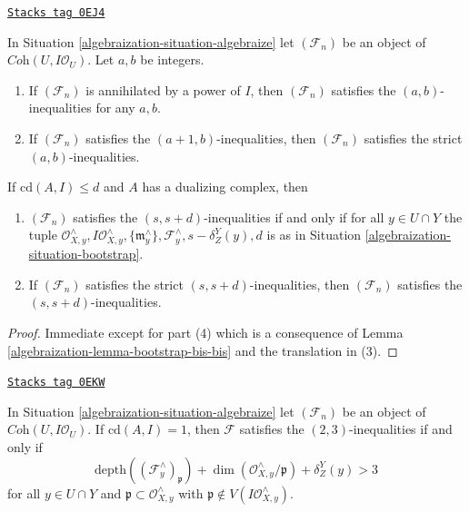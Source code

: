 \begin{lemma}[Elementary]
\label{algebraization-lemma-elementary}
\href{https://stacks.math.columbia.edu/tag/0EJ4}{\texttt{Stacks tag 0EJ4}}

In Situation \ref{algebraization-situation-algebraize} let $(\mathcal{F}_n)$ be an object
of $\textit{Coh}(U, I\mathcal{O}_U)$. Let $a, b$ be integers.
\begin{enumerate}
\item If $(\mathcal{F}_n)$ is annihilated by a power of $I$, then
$(\mathcal{F}_n)$ satisfies the $(a, b)$-inequalities for any $a, b$.
\item If $(\mathcal{F}_n)$ satisfies the $(a + 1, b)$-inequalities, then
$(\mathcal{F}_n)$ satisfies the strict $(a, b)$-inequalities.
\end{enumerate}
If $\text{cd}(A, I) \leq d$ and $A$ has a dualizing complex, then
\begin{enumerate}
\item[(3)] $(\mathcal{F}_n)$ satisfies the $(s, s + d)$-inequalities
if and only if for all $y \in U \cap Y$ the tuple
$\mathcal{O}_{X, y}^\wedge, I\mathcal{O}_{X, y}^\wedge,
\{\mathfrak m_y^\wedge\}, \mathcal{F}_y^\wedge, s - \delta^Y_Z(y), d$
is as in Situation \ref{algebraization-situation-bootstrap}.
\item[(4)]
If $(\mathcal{F}_n)$ satisfies the strict $(s, s + d)$-inequalities, then
$(\mathcal{F}_n)$ satisfies the $(s, s + d)$-inequalities.
\end{enumerate}
\end{lemma}

\begin{proof}

Immediate except for part (4) which is a consequence of
Lemma \ref{algebraization-lemma-bootstrap-bis-bis} and the translation in (3).
\end{proof}

\begin{lemma}[Explain 2 3 cd 1]
\label{algebraization-lemma-explain-2-3-cd-1}
\href{https://stacks.math.columbia.edu/tag/0EKW}{\texttt{Stacks tag 0EKW}}

In Situation \ref{algebraization-situation-algebraize} let $(\mathcal{F}_n)$ be an object
of $\textit{Coh}(U, I\mathcal{O}_U)$. If $\text{cd}(A, I) = 1$, then
$\mathcal{F}$ satisfies the $(2, 3)$-inequalities if and only if
$$
\text{depth}((\mathcal{F}^\wedge_y)_\mathfrak p) +
\dim(\mathcal{O}_{X, y}^\wedge/\mathfrak p) + \delta^Y_Z(y) > 3
$$
for all $y \in U \cap Y$ and $\mathfrak p \subset \mathcal{O}_{X, y}^\wedge$
with $\mathfrak p \not \in V(I\mathcal{O}_{X, y}^\wedge)$.
\end{lemma}


